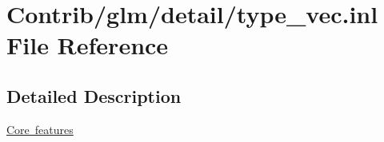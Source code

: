 \hypertarget{type__vec_8inl}{}\section{Contrib/glm/detail/type\+\_\+vec.inl File Reference}
\label{type__vec_8inl}


\subsection{Detailed Description}
\mbox{\hyperlink{group__core}{Core features}} 